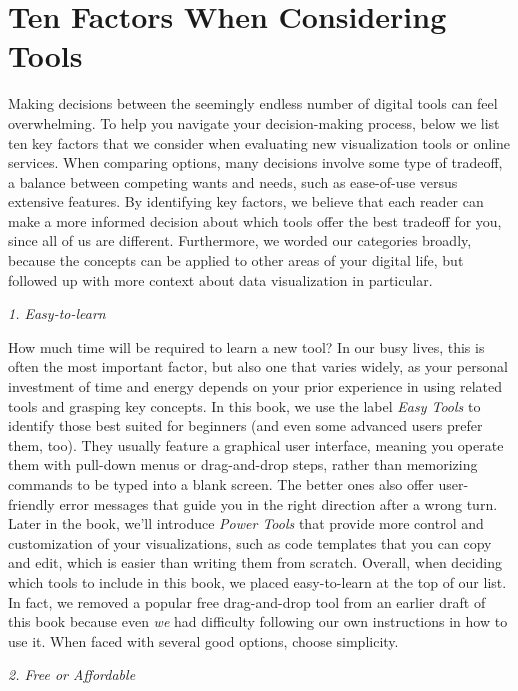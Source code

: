 \documentclass[
  english,
]{book}
\begin{document}
\hypertarget{tool-factors}{%
\section*{Ten Factors When Considering Tools}\label{tool-factors}}

Making decisions between the seemingly endless number of digital tools can feel overwhelming. To help you navigate your decision-making process, below we list ten key factors that we consider when evaluating new visualization tools or online services. When comparing options, many decisions involve some type of tradeoff, a balance between competing wants and needs, such as ease-of-use versus extensive features. By identifying key factors, we believe that each reader can make a more informed decision about which tools offer the best tradeoff for you, since all of us are different. Furthermore, we worded our categories broadly, because the concepts can be applied to other areas of your digital life, but followed up with more context about data visualization in particular.

\emph{1. Easy-to-learn}

How much time will be required to learn a new tool? In our busy lives, this is often the most important factor, but also one that varies widely, as your personal investment of time and energy depends on your prior experience in using related tools and grasping key concepts. In this book, we use the label \emph{Easy Tools} to identify those best suited for beginners (and even some advanced users prefer them, too). They usually feature a graphical user interface, meaning you operate them with pull-down menus or drag-and-drop steps, rather than memorizing commands to be typed into a blank screen. The better ones also offer user-friendly error messages that guide you in the right direction after a wrong turn. Later in the book, we'll introduce \emph{Power Tools} that provide more control and customization of your visualizations, such as code templates that you can copy and edit, which is easier than writing them from scratch. Overall, when deciding which tools to include in this book, we placed easy-to-learn at the top of our list. In fact, we removed a popular free drag-and-drop tool from an earlier draft of this book because even \emph{we} had difficulty following our own instructions in how to use it. When faced with several good options, choose simplicity.

\emph{2. Free or Affordable}
\end{document}
